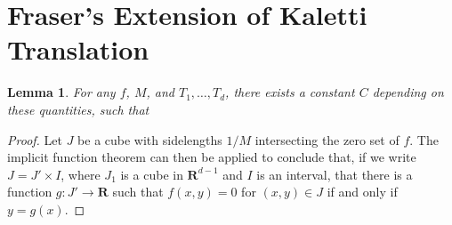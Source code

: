 \documentclass{article}
\theoremstyle{plain}
\newtheorem{lemma}{Lemma}
\theoremstyle{plain}
\begin{document}
\section{Fraser's Extension of Kaletti Translation}

\begin{lemma}
    For any $f$, $M$, and $T_1, \dots, T_d$, there exists a constant $C$ depending on these quantities, such that
\end{lemma}
\begin{proof}
    Let $J$ be a cube with sidelengths $1/M$ intersecting the zero set of $f$. The implicit function theorem can then be applied to conclude that, if we write $J = J' \times I$, where $J_1$ is a cube in $\mathbf{R}^{d-1}$ and $I$ is an interval, that there is a function $g: J' \to \mathbf{R}$ such that $f(x,y) = 0$ for $(x,y) \in J$ if and only if $y = g(x)$.
\end{proof}
\end{document}
